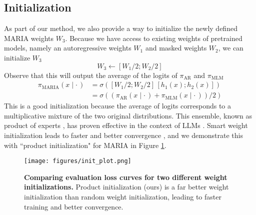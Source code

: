\subsection*{Initialization}
As part of our method, we also provide a way to initialize the newly defined MARIA weights $W_3$. Because we have access to existing weights of pretrained models, namely an autoregressive weights $W_1$ and masked weights $W_2$, we can initialize $W_3$
\begin{equation}
    W_3 \leftarrow [W_1/2; W_2/2]
\end{equation}
Observe that this will output the average of the logits of $\pi_{\mathrm{AR}}$ and $\pi_{\mathrm{MLM}}$
\begin{align}
    \pi_{\mathrm{MARIA}}(x \mid \cdot\,) &= \sigma([W_1/2; W_2 / 2] \, [h_1(x); h_2(x)]) \\
    &= \sigma((\pi_{\mathrm{AR}}(x \mid \cdot\,)+\pi_{\mathrm{MLM}}(x \mid \cdot\,))/2)
\end{align}
This is a good initialization because the average of logits corresponds to a multiplicative mixture of the two original distributions. This ensemble, known as product of experts \cite{hinton2002training}, has proven effective in the context of LLMs \cite{liu2021dexperts}. Smart weight initialization leads to faster and better convergence \cite{samragh2024scaling}, and we demonstrate this with ``product initialization" for MARIA in Figure \ref{fig:init}.
\begin{figure}
    \centering
    \texttt{[image: figures/init\_plot.png]}
    \caption{\textbf{Comparing evaluation loss curves for two different weight initializations.} Product initialization (ours) is a far better weight initialization than random weight initialization, leading to faster training and better convergence.}
    \label{fig:init}
\end{figure}
